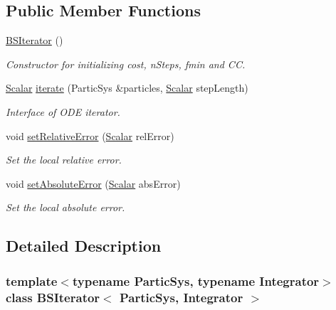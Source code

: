 \subsection*{Public Member Functions}
\begin{DoxyCompactItemize}
\item 
\mbox{\hyperlink{class_b_s_iterator_a144fb5c55fcd7bc873e73f4d06276fb2}{B\+S\+Iterator}} ()
\begin{DoxyCompactList}\small\item\em Constructor for initializing cost, n\+Steps, fmin and CC. \end{DoxyCompactList}\item 
\mbox{\hyperlink{class_b_s_iterator_a44773ad0f46d97005c8e21fa7c155c6f}{Scalar}} \mbox{\hyperlink{class_b_s_iterator_a47c558caa06982900eac316e10b50d4d}{iterate}} (Partic\+Sys \&particles, \mbox{\hyperlink{class_b_s_iterator_a44773ad0f46d97005c8e21fa7c155c6f}{Scalar}} step\+Length)
\begin{DoxyCompactList}\small\item\em Interface of O\+DE iterator. \end{DoxyCompactList}\item 
void \mbox{\hyperlink{class_b_s_iterator_ada9b6cc673e297135646699d581fcdc7}{set\+Relative\+Error}} (\mbox{\hyperlink{class_b_s_iterator_a44773ad0f46d97005c8e21fa7c155c6f}{Scalar}} rel\+Error)
\begin{DoxyCompactList}\small\item\em Set the local relative error. \end{DoxyCompactList}\item 
void \mbox{\hyperlink{class_b_s_iterator_a57603539823be271c2229d0951b7d957}{set\+Absolute\+Error}} (\mbox{\hyperlink{class_b_s_iterator_a44773ad0f46d97005c8e21fa7c155c6f}{Scalar}} abs\+Error)
\begin{DoxyCompactList}\small\item\em Set the local absolute error. \end{DoxyCompactList}\end{DoxyCompactItemize}


\subsection{Detailed Description}
\subsubsection*{template$<$typename Partic\+Sys, typename Integrator$>$\newline
class B\+S\+Iterator$<$ Partic\+Sys, Integrator $>$}


